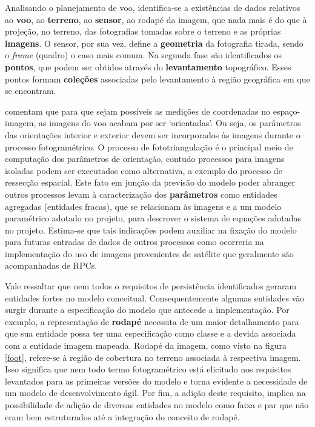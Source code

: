Analisando o planejamento de voo, identifica-se a existências de dados relativos ao \textbf{voo}, ao \textbf{terreno}, ao \textbf{sensor}, ao rodapé da imagem, que nada mais é do que à projeção, no terreno, das fotografias tomadas sobre o terreno e as próprias \textbf{imagens}. O sensor, por sua vez, define a \textbf{geometria} da fotografia tirada, sendo o \textit{frame} (quadro) o caso mais comum. Na segunda fase são identificados os \textbf{pontos}, que podem ser obtidos através do \textbf{levantamento} topográfico. Esses pontos formam \textbf{coleções} associadas pelo levantamento à região geográfica em que se encontram.

 comentam que para que sejam possíveis as medições de coordenadas no espaço-imagem, as imagens do voo acabam por ser `orientadas'. Ou seja, os parâmetros das orientações interior e exterior devem ser incorporados às imagens durante o processo fotogramétrico. O processo de fototriangulação é o principal meio de computação dos parâmetros de orientação, contudo processos para imagens isoladas podem ser executados como alternativa, a exemplo do processo de ressecção espacial. Este fato em junção da previsão do modelo poder abranger outros processos levam à caracterização dos \textbf{parâmetros} como entidades agregadas (entidades fracas), que se relacionam às imagens e a um modelo paramétrico adotado no projeto, para descrever o sistema de equações adotadas no projeto. Estima-se que tais indicações podem auxiliar na fixação do modelo para futuras entradas de dados de outros processos como ocorreria na implementação do uso de imagens provenientes de satélite que geralmente são acompanhadas de RPCs.

Vale ressaltar que nem todos o requisitos de persistência identificados geraram entidades fortes no modelo conceitual. Consequentemente algumas entidades vão surgir durante a especificação do modelo que antecede a implementação. Por exemplo, a representação de \textbf{rodapé} necessita de um maior detalhamento para que sua entidade possa ter uma especificação como classe e a devida associada com a entidade imagem mapeada. Rodapé da imagem, como visto na figura \ref{foot}, refere-se à região de cobertura no terreno associada à respectiva imagem. Isso significa que nem todo termo fotogramétrico está elicitado nos requisitos levantados para as primeiras versões do modelo e torna evidente a necessidade de um modelo de desenvolvimento ágil. Por fim, a adição deste requisito, implica na possibilidade de adição de diversas entidades no modelo como faixa e par que não eram bem estruturados até a integração do conceito de rodapé.

